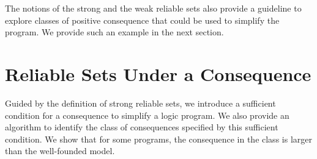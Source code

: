 \documentclass{article}
\begin{document}

The notions of the strong and the weak reliable sets also provide a guideline to explore classes of positive consequence that could be used to simplify the program. We provide such an example in the next section.

\section{Reliable Sets Under a Consequence}\label{sec:6}


Guided by the definition of strong reliable sets, we introduce a sufficient condition for a consequence to simplify a logic program. We also provide an algorithm to identify the class of consequences specified by this sufficient condition.
We show that for some programs, the consequence in the class is larger than the well-founded model.





\end{document}
